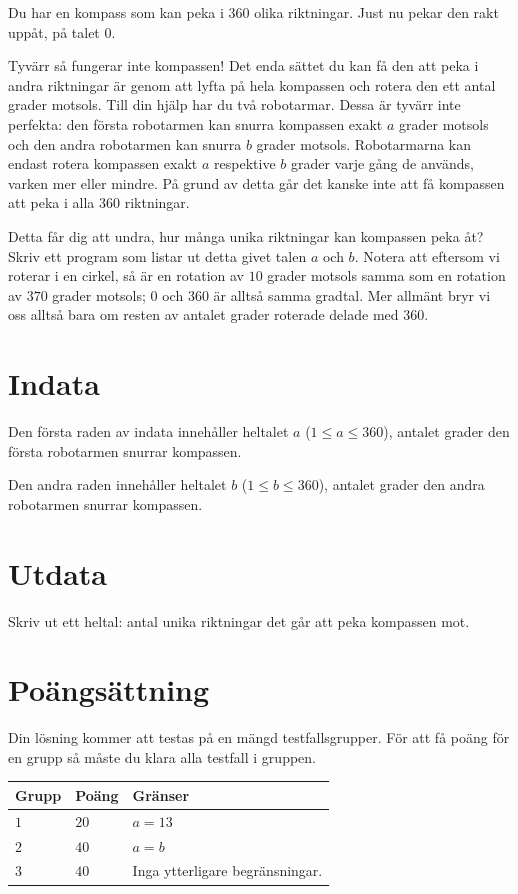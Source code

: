 
Du har en kompass som kan peka i $360$ olika riktningar. Just nu pekar den rakt uppåt, på talet $0$.

Tyvärr så fungerar inte kompassen! Det enda sättet du kan få den att peka i andra riktningar
är genom att lyfta på hela kompassen och rotera den ett antal grader motsols. Till din hjälp har du
två robotarmar. Dessa är tyvärr inte perfekta: den första robotarmen kan
snurra kompassen exakt $a$ grader motsols och den andra robotarmen kan snurra $b$ grader motsols.
Robotarmarna kan endast rotera kompassen exakt $a$ respektive $b$ grader varje gång
de används, varken mer eller mindre.
På grund av detta går det kanske inte att få kompassen att peka
i alla $360$ riktningar.

Detta får dig att undra, hur många unika riktningar kan kompassen peka åt? Skriv ett program
som listar ut detta givet talen $a$ och $b$. Notera att eftersom vi roterar i en cirkel,
så är en rotation av $10$ grader motsols samma som en rotation av $370$ grader motsols;
$0$ och $360$ är alltså samma gradtal.
Mer allmänt bryr vi oss alltså bara om resten av antalet grader roterade delade med $360$.


\section*{Indata}
Den första raden av indata innehåller heltalet $a$ ($1 \leq a \leq 360$),
antalet grader den första robotarmen snurrar kompassen.

Den andra raden innehåller heltalet $b$ ($1 \leq b \leq 360$),
antalet grader den andra robotarmen snurrar kompassen.

\section*{Utdata}
Skriv ut ett heltal: antal unika riktningar det går att peka kompassen mot.

\section*{Poängsättning}
Din lösning kommer att testas på en mängd testfallsgrupper.
För att få poäng för en grupp så måste du klara alla testfall i gruppen.

\noindent
\begin{tabular}{| l | l | p{12cm} |}
  \hline
  \textbf{Grupp} & \textbf{Poäng} & \textbf{Gränser} \\ \hline
  $1$    & $20$  & $a = 13$ \\ \hline
  $2$    & $40$  & $a = b$ \\ \hline
  $3$    & $40$  & Inga ytterligare begränsningar. \\ \hline
\end{tabular}

